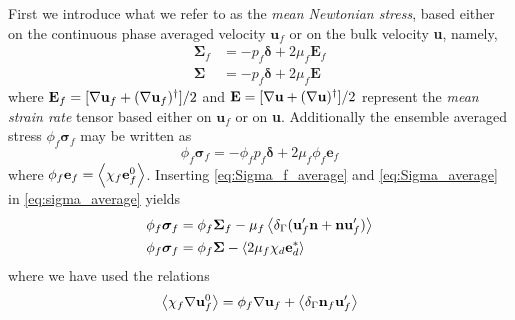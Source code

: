 First we introduce what we refer to as the \textit{mean Newtonian stress}, based either on the continuous phase averaged velocity $\textbf{u}_f$ or on the bulk velocity \textbf{u}, namely,
\begin{align}
    \bm\Sigma_f 
    &
    = -p_f \bm\delta + 2\mu_f \textbf{E}_f    
    \label{eq:Sigma_f_average}
    \\
    \bm\Sigma &
    = -p_f\bm\delta + 2 \mu_f \textbf{E}
    \label{eq:Sigma_average}
\end{align}
where $\textbf{E}_f = [\mathbf{\nabla} \textbf{u}_f + (\mathbf{\nabla} \textbf{u}_f)^{\dagger}]/2$ and $\textbf{E} =[\mathbf{\nabla} \textbf{u} + (\mathbf{\nabla} \textbf{u})^{\dagger}]/2$ represent the \textit{mean strain rate} tensor based either on $\textbf{u}_f$ or on \textbf{u}. 
Additionally the ensemble averaged stress $\phi_f \bm\sigma_f$ may be written as 
\begin{equation}
    \phi_f \bm\sigma_f = - \phi _f p_f \bm\delta + 2 \mu_ f \phi_f \textbf{e}_f
    \label{eq:sigma_average}
\end{equation}
where $\phi _f \textbf{e}_f = \left<\chi _f \textbf{e}_f^0\right>$. 
Inserting \ref{eq:Sigma_f_average} and \ref{eq:Sigma_average} in  \ref{eq:sigma_average} yields
\begin{align}
    \phi_f \bm\sigma_f 
    &=
    \phi_f \bm\Sigma_f
    - \mu_f \avg{\delta_\Gamma( \textbf{u}_f'  \textbf{n} +  \textbf{n} \textbf{u}_f' )}
    \label{eq:stress_closure}\\
    \phi_f \bm\sigma_f 
    &=
    \phi_f \bm\Sigma
    - \avg{2\mu_f \chi_d \textbf{e}_d^*}
    \label{eq:stress_closure1}
\end{align}
where we have used the relations 
\begin{equation}
    \avg{\chi_f \grad \textbf{u}_f^0}
    = 
    \phi_f \grad  \textbf{u}_f
    + \avg{\delta_\Gamma \textbf{n}_f \textbf{u}_f'}
    \label{eq:first_rel}
\end{equation}
